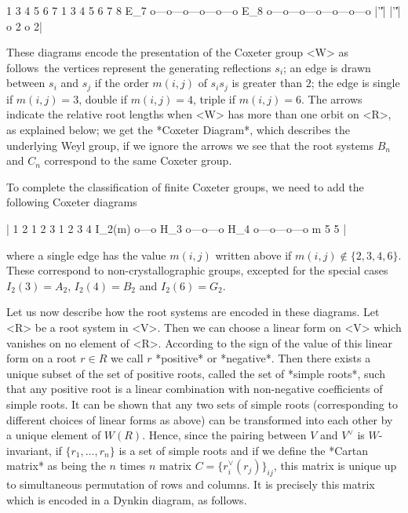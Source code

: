          1   3   4   5   6   7            1   3   4   5   6   7   8
   E_7   o---o---o---o---o---o       E_8  o---o---o---o---o---o---o
                 |'\|'|                                |'\|'|
                 o 2                              o 2|
\par\bigskip
These  diagrams  encode  the  presentation  of  the  Coxeter  group  <W> as
follows\:\ the vertices represent the generating reflections $s_i$; an edge
is  drawn between  $s_i$ and  $s_j$ if  the order  $m(i,j)$ of  $s_is_j$ is
greater  than $2$; the edge is  single if $m(i,j)=3$, double if $m(i,j)=4$,
triple  if $m(i,j)=6$. The  arrows indicate the  relative root lengths when
<W> has more than one orbit on <R>, as explained below; we get the *Coxeter
Diagram*,  which  describes  the  underlying  Weyl  group, if we ignore the
arrows\:  we see that  the root systems  $B_n$ and $C_n$  correspond to the
same Coxeter group.

To complete the classification of finite Coxeter groups, we need to add the
following Coxeter diagrams\:

|             1   2                 1   2   3          1   2   3   4
   I_2(m)    o---o            H_3  o---o---o     H_4  o---o---o---o
               m                     5                  5           |

where  a single edge has the value $m(i,j)$ written above if $m(i,j)\not\in
\{2,3,4,6\}$. These correspond to non-crystallographic groups, excepted for
the special cases $I_2(3)=A_2$, $I_2(4)=B_2$ and $I_2(6)=G_2$.

Let us now describe how the root systems are encoded in these diagrams. Let
<R>  be a root system in <V>. Then we can choose a linear form on <V> which
vanishes  on no element of <R>. According to  the sign of the value of this
linear  form on a root $r \in R$ we call $r$ *positive* or *negative*. Then
there  exists a unique subset of the  set of positive roots, called the set
of *simple roots*, such that any positive root is a linear combination with
non-negative  coefficients of  simple roots.  It can  be shown that any two
sets of simple roots (corresponding to different choices of linear forms as
above)  can be transformed into  each other by a  unique element of $W(R)$.
Hence,  since the  pairing between  $V$ and  $V^\vee$ is  $W$-invariant, if
$\{r_1,\ldots,r_n\}$  is a set of simple roots and if we define the *Cartan
matrix*  as being the $n$ times $n$ matrix $C=\{r_i^\vee(r_j)\}_{ij}$, this
matrix  is unique up to simultaneous permutation of rows and columns. It is
precisely this matrix which is encoded in a Dynkin diagram, as follows.

